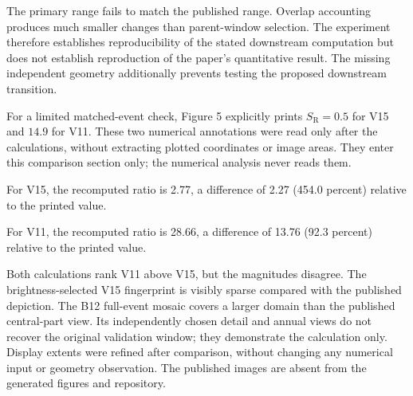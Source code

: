 The primary range fails to match the published range. Overlap accounting produces much smaller changes than parent-window selection. The experiment therefore establishes reproducibility of the stated downstream computation but does not establish reproduction of the paper's quantitative result. The missing independent geometry additionally prevents testing the proposed downstream transition.

For a limited matched-event check, Figure 5 explicitly prints $S_{\mathrm R}=0.5$ for V15 and $14.9$ for V11. These two numerical annotations were read only after the calculations, without extracting plotted coordinates or image areas. They enter this comparison section only; the numerical analysis never reads them.

For V15, the recomputed ratio is 2.77, a difference of 2.27 (454.0 percent) relative to the printed value.

For V11, the recomputed ratio is 28.66, a difference of 13.76 (92.3 percent) relative to the printed value.

Both calculations rank V11 above V15, but the magnitudes disagree. The brightness-selected V15 fingerprint is visibly sparse compared with the published depiction. The B12 full-event mosaic covers a larger domain than the published central-part view. Its independently chosen detail and annual views do not recover the original validation window; they demonstrate the calculation only. Display extents were refined after comparison, without changing any numerical input or geometry observation. The published images are absent from the generated figures and repository.
